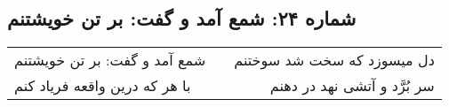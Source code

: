 \begin{center}
\section*{شماره ۲۴: شمع آمد و گفت: بر تن خویشتنم}
\label{sec:024}
\begin{longtable}{l p{0.5cm} r}
شمع آمد و گفت: بر تن خویشتنم
&&
دل میسوزد که سخت شد سوختنم
\\
با هر که درین واقعه فریاد کنم
&&
سر بُرَّد و آتشی نهد در دهنم
\\
\end{longtable}
\end{center}
